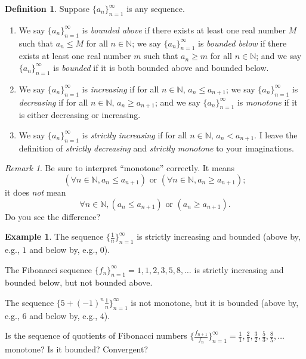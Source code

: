 \documentclass[12pt]{amsart}
\newcommand{\N}{\mathbb{N}}
\numberwithin{equation}{section}
\theoremstyle{plain} %
\theoremstyle{definition}
\newtheorem{defn}[equation]{Definition}
\newtheorem{ex}[equation]{Example}
\theoremstyle{remark}
\newtheorem{rem}[equation]{Remark}
\begin{document}
\begin{defn} Suppose $\{a_n\}_{n=1}^\infty$ is any sequence. 

\begin{enumerate}

\item 
We say $\{a_n\}_{n=1}^\infty$ is {\em bounded above} if there  exists at least one real number $M$ such that $a_n \leq M$ for all $n   \in
\N$; 
we say $\{a_n\}_{n=1}^\infty$ is {\em bounded below} if there  exists at least one real number $m$ such that $a_n \geq m$ for all $n   \in
\N$; and we say 
$\{a_n\}_{n=1}^\infty$ is {\em bounded} if it is both bounded above and bounded below.

\item We say $\{a_n\}_{n=1}^\infty$ is {\em increasing} if for all $n \in \N$, $a_n \leq a_{n+1}$;
we say $\{a_n\}_{n=1}^\infty$ is {\em decreasing} if for all $n \in \N$, $a_n \geq a_{n+1}$; and we say
$\{a_n\}_{n=1}^\infty$ is {\em monotone} if it is either decreasing or increasing.

\item We say $\{a_n\}_{n=1}^\infty$ is {\em strictly increasing} if for all $n \in \N$, $a_n < a_{n+1}$. I leave the definition of
{\em strictly decreasing} and {\em strictly monotone} to your imaginations.
\end{enumerate}
\end{defn}


\begin{rem} Be sure to interpret ``monotone'' correctly. It means
$$
\left(\forall n \in \N, a_n \leq a_{n+1}\right) \text{ or }
\left(\forall n \in \N, a_n \geq a_{n+1}\right);
$$
it does {\em not} mean
$$
\forall n \in \N, \left( a_n \leq a_{n+1}\right) \text{ or } \left(a_n \geq a_{n+1}\right).
$$
Do you see the difference?
\end{rem}


\begin{ex} The sequence $\{\frac{1}{n}\}_{n=1}^\infty$ is strictly increasing and bounded (above by, e.g., $1$ and below by, e.g., $0$).

The Fibonacci sequence $\{f_n\}_{n=1}^{\infty} = 1,1,2,3,5,8,\dots$ is strictly increasing and bounded below, but not bounded above.

The sequence $\{5 + (-1)^n \frac{1}{n}\}_{n=1}^\infty$ is not monotone, but it is bounded (above by, e.g., $6$ and below by, e.g., $4$).

Is the sequence of quotients of Fibonacci numbers $\{\frac{f_{n+1}}{f_n}\}_{n=1}^{\infty} = \frac{1}{1}, \frac{2}{1}, \frac{3}{2}, \frac{5}{3},\frac{8}{5},\dots$
monotone? Is it bounded? Convergent?
\end{ex}
\end{document}
